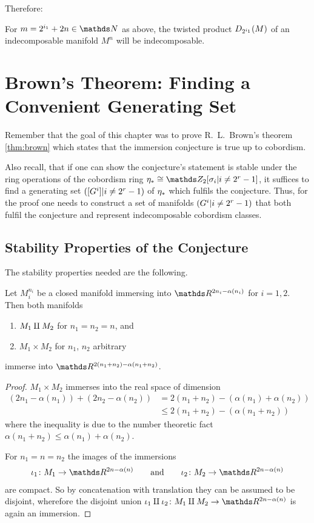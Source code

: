 Therefore:
\begin{Cor}\label{cor:twistedprod:indecompcriterion}
  For $m=2^{i_1}+2n\in\Nat$ as above, the twisted product
  $D_{2^{i_1}}({M})$ of an indecomposable manifold $M^n$ will be
  indecomposable.
\end{Cor}


\section
{Brown's Theorem: Finding a Convenient Generating Set}
\label{sec:proofbrown}
Remember that the goal of this chapter was to prove R.~L.~Brown's
theorem \ref{thm:brown} which states that the immersion conjecture is
true up to cobordism.

Also recall, that if one can show the conjecture's statement is stable
under the ring operations of the cobordism ring
$\c_*\cong\Zmod2[\sigma_i|i\neq2^r-1]$, it suffices to find a
generating set $([G^{i}]|i\neq2^r-1)$ of $\eta_*$ which fulfils the conjecture.
Thus, for the proof one needs to construct a set of manifolds
$(G^{i}|i\neq2^r-1)$ that both fulfil the conjecture and represent
indecomposable cobordism classes.

\subsection{Stability Properties of the Conjecture}
The stability properties needed are the following.
\begin{Lem}\label{lem:brownstableunderringops}
  Let $M_i^{n_i}$ be a closed manifold immersing into
  $\R^{2n_i-\alpha(n_i)}$ for $i=1,2$.
  Then both manifolds
  \begin{enumerate}
  \item $M_1\amalg M_2$ for $n_1=n_2=n$, and
  \item $M_1\times M_2$ for $n_1$, $n_2$ arbitrary
  \end{enumerate}
  immerse into $\R^{2(n_1+n_2)-\alpha(n_1+n_2)}$.
  \begin{proof}
    $M_1\times M_2$ immerses into the real space of dimension
    \begin{align*}
      \left( 2n_1-\alpha(n_1) \right)
      + \left( 2n_2-\alpha(n_2) \right)
      &= 2(n_1+n_2) - \left(\alpha(n_1)+\alpha(n_2)\right)\\
      &\leq 2(n_1+n_2) - \left(\alpha(n_1 + n_2)\right)
    \end{align*}
    where the inequality is due to the number theoretic fact
    $\alpha(n_1+n_2) \leq \alpha(n_1)+\alpha(n_2)$.

    For $n_1=n=n_2$ the images of the immersions
    \begin{gather*}
      \iota_1\colon M_1\to\R^{2n-\alpha(n)}
      \qquad \text{and} \qquad
      \iota_2\colon M_2\to\R^{2n-\alpha(n)}
    \end{gather*}
    are compact. So by
    concatenation with translation they can be assumed to be disjoint,
    wherefore the disjoint union
    $\iota_1\disjointsum\iota_2\colon M_1\disjointsum M_2\to\R^{2n-\alpha(n)}$
    is again an immersion.
  \end{proof}
\end{Lem}


